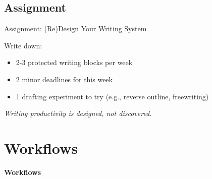 \documentclass{beamer}
\begin{document}
\subsection{Assignment}

\begin{frame}{Assignment: (Re)Design Your Writing System}

Write down:
\begin{itemize}
    \item 2-3 protected writing blocks per week
    \item 2 minor deadlines for this week
    \item 1 drafting experiment to try {\small (e.g., reverse outline, freewriting)}
\end{itemize}

\vspace{1em}

\center
\textit{Writing productivity is designed, not discovered.}

\end{frame}




\section{Workflows}

\begin{frame}
  \centering
  \vfill
  {\Large\bfseries Workflows}
  \vfill
\end{frame}




\end{document}
